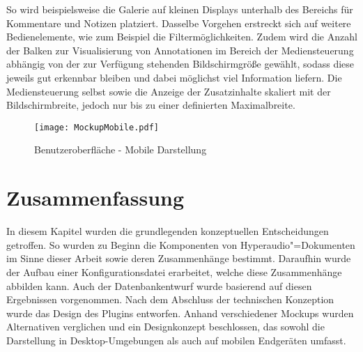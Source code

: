 So wird beispielsweise die Galerie auf kleinen Displays unterhalb des Bereichs für Kommentare und Notizen platziert. Dasselbe Vorgehen erstreckt sich auf weitere Bedienelemente, wie zum Beispiel die Filtermöglichkeiten. Zudem wird die Anzahl der Balken zur Visualisierung von Annotationen im Bereich der Mediensteuerung abhängig von der zur Verfügung stehenden Bildschirmgröße gewählt, sodass diese jeweils gut erkennbar bleiben und dabei möglichst viel Information liefern. Die Mediensteuerung selbst sowie die Anzeige der Zusatzinhalte skaliert mit der Bildschirmbreite, jedoch nur bis zu einer definierten Maximalbreite.

\vspace*{0.8cm}

\begin{figure}[h!]
\texttt{[image: MockupMobile.pdf]}
\caption{\label{fig:MockupMobile} Benutzeroberfläche - Mobile Darstellung}
\end{figure}

\section{Zusammenfassung}
In diesem Kapitel wurden die grundlegenden konzeptuellen Entscheidungen getroffen. So wurden zu Beginn die Komponenten von Hyperaudio"=Dokumenten im Sinne dieser Arbeit sowie deren Zusammenhänge bestimmt. Daraufhin wurde der Aufbau einer Konfigurationsdatei erarbeitet, welche diese Zusammenhänge abbilden kann. Auch der Datenbankentwurf wurde basierend auf diesen Ergebnissen vorgenommen. Nach dem Abschluss der technischen Konzeption wurde das Design des Plugins entworfen. Anhand verschiedener Mockups wurden Alternativen verglichen und ein Designkonzept beschlossen, das sowohl die Darstellung in Desktop-Umgebungen als auch auf mobilen Endgeräten umfasst.
